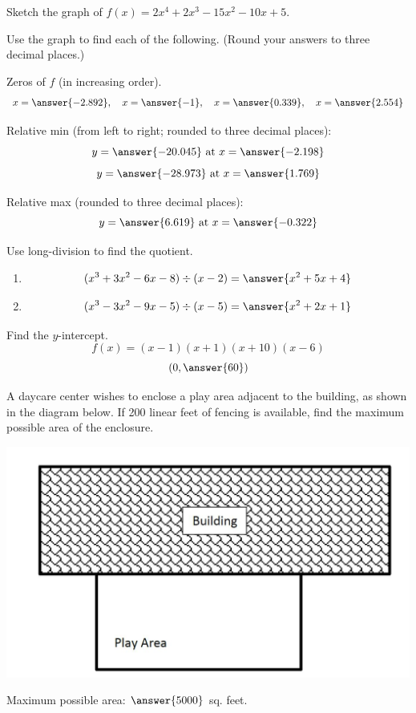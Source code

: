\documentclass{ximera}
\begin{document}
  \begin{problem}\label{prob:160hom5prob6} 
  Sketch the graph of $f(x)=2x^4+2x^3-15x^2-10x+5$.
  \begin{center}  
\end{center}
  Use the graph to find each of the following.  (Round your answers to three decimal places.)
  
  Zeros of $f$ (in increasing order).
  $$x=\answer{-2.892},\quad x=\answer{-1},\quad x=\answer{0.339},\quad x=\answer{2.554}$$
  
  Relative min (from left to right; rounded to three decimal places):
  $$y=\answer{-20.045} \mbox{ at } x=\answer{-2.198}$$
  $$y=\answer{-28.973}\mbox{ at } x=\answer{1.769}$$
  
  Relative max (rounded to three decimal places):
  $$y=\answer{6.619}\mbox{ at } x=\answer{-0.322}$$
    \end{problem}
    
  
\begin{problem}\label{prob:160hom5prob4} Use long-division to find the quotient.
\begin{enumerate}
  \item $$(x^3+3x^2-6x-8)\div (x-2)=\answer{x^2+5x+4}$$
  \item $$(x^3-3x^2-9x-5)\div (x-5)=\answer{x^2+2x+1}$$
  \end{enumerate}
  \end{problem}    
 
 \begin{problem}\label{prob:160hom5prob7}
 Find the $y$-intercept.
 $$f(x)=(x-1)(x+1)(x+10)(x-6)$$
 $$(0,\answer{60})$$
 \end{problem}
 

 
  \begin{problem}\label{prob:160hom6prob1} 
 A daycare center wishes to enclose a play area adjacent to the building, as shown in the diagram below.  If 200 linear feet of fencing is available, find the maximum possible area of the enclosure. 
 \begin{image}
   \includegraphics[height=3in]{160H6pic1.jpg}
 \end{image}
 Maximum possible area: $\answer{5000}$ sq. feet.
 \end{problem}
 
\end{document}
